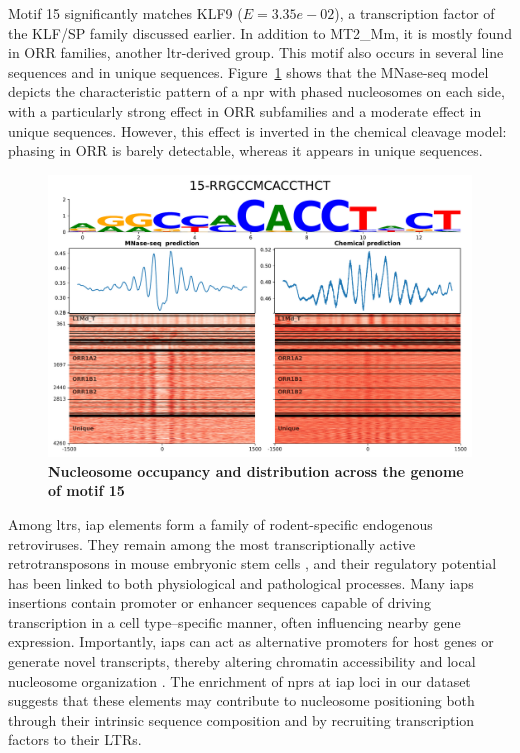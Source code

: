 \documentclass[11pt]{book}
\begin{document}
Motif 15 significantly matches KLF9 ($E=3.35e-02$), a transcription factor of the KLF/SP family discussed earlier. In addition to MT2\_Mm, it is mostly found in ORR families, another \gls{ltr}-derived group. This motif also occurs in several \gls{line} sequences and in unique sequences. Figure~\ref{fig:xstreme15_ltr} shows that the MNase-seq model depicts the characteristic pattern of a \gls{npr} with phased nucleosomes on each side, with a particularly strong effect in ORR subfamilies and a moderate effect in unique sequences. However, this effect is inverted in the chemical cleavage model: phasing in ORR is barely detectable, whereas it appears in unique sequences.

\begin{figure}[htbp]
    \centering
    \includegraphics[width=\textwidth]{Figures/Results/xstreme_onrep_meta_hm/15-RRGCCMCACCTHCT.pdf}
    \caption{\textbf{Nucleosome occupancy and distribution across the genome of motif 15}}
    \label{fig:xstreme15_ltr}
\end{figure}

Among \glspl{ltr}, \gls{iap} elements form a family of rodent-specific endogenous retroviruses. They remain among the most transcriptionally active retrotransposons in mouse embryonic stem cells \cite{dewannieux_identification_2004}, and their regulatory potential has been linked to both physiological and pathological processes. Many \glspl{iap} insertions contain promoter or enhancer sequences capable of driving transcription in a cell type–specific manner, often influencing nearby gene expression. Importantly, \glspl{iap} can act as alternative promoters for host genes or generate novel transcripts, thereby altering chromatin accessibility and local nucleosome organization \cite{sharif_is_2013, elmer_genomic_2021}. The enrichment of \glspl{npr} at \gls{iap} loci in our dataset suggests that these elements may contribute to nucleosome positioning both through their intrinsic sequence composition and by recruiting transcription factors to their LTRs.
\end{document}

